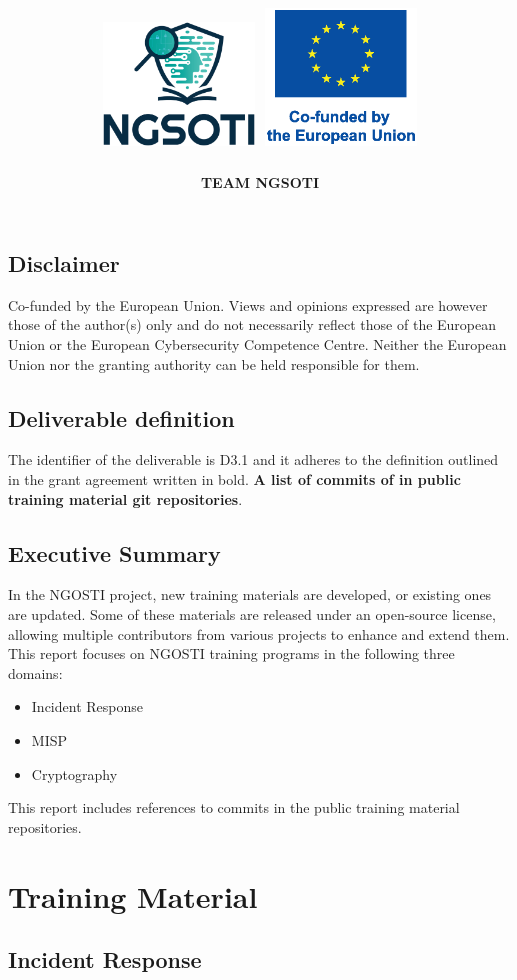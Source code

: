 \documentclass[10pt,a4paper]{report}
\title{
    \Huge \textbf{\delivtitle} \\[0.5cm]
    \includegraphics[width=0.3\textwidth]{img/ngsoti.eps}
    \hspace{1cm}
    \includegraphics[width=0.3\textwidth]{img/eu_funded_en.eps}
}
\author{\textbf{TEAM NGSOTI}}
\date{\delivdate}
\begin{document}
\maketitle
\thispagestyle{empty} %

\newpage
\tableofcontents
\newpage
\section*{Disclaimer}
Co-funded by the European Union. Views and opinions expressed are however those of the author(s) only
and do not necessarily reflect those of the European Union or the European Cybersecurity Competence Centre. Neither
the European Union nor the granting authority can be held responsible for them.

\section*{Deliverable definition}
The identifier of the deliverable is D3.1 and it adheres to the definition outlined in the grant agreement
written in bold. \textbf{A list of commits of in public training material git repositories}.

\section*{Executive Summary}
In the NGOSTI project, new training materials are developed, or existing ones
are updated. Some of these materials are released under an open-source license,
allowing multiple contributors from various projects to enhance and extend them.
This report focuses on NGOSTI training programs in the following three domains:

\begin{itemize}
    \item Incident Response
    \item MISP
    \item Cryptography
\end{itemize}

This report includes references to commits in the public training material
repositories.

\chapter{Training Material}

\section{Incident Response}
\end{document}
